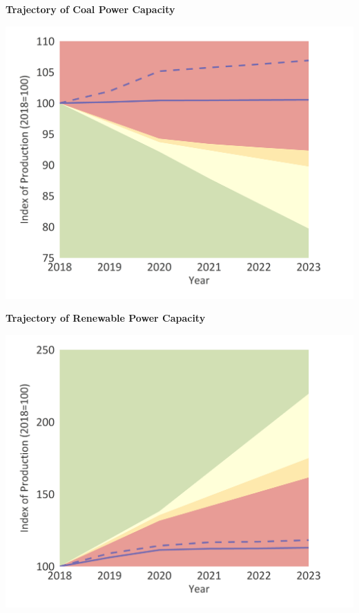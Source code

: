 \documentclass[10pt,table,a4]{article}\usepackage[]{graphicx}\usepackage[]{color}
\begin{document}
		\begin{minipage}[t]{.49\linewidth}
			\textbf{Trajectory of Coal Power Capacity }
		
			\includegraphics[trim = {0 0cm 0 0},width=1\linewidth]{Figures/Fig14}
			
			\textbf{Trajectory of Renewable Power Capacity }

			\includegraphics[trim = {0 0cm 0 0},width=.99\linewidth]{Figures/Fig15}
		\end{minipage}	
		\hspace{.02\linewidth}
\end{document}
